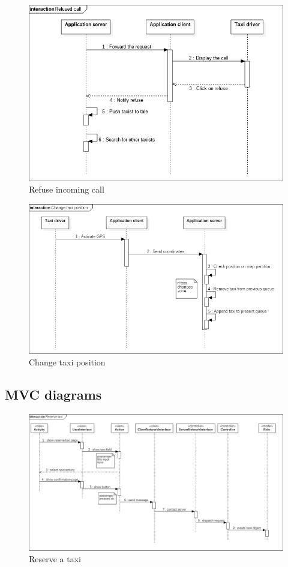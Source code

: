 \begin{figure} [h]
\centering
\includegraphics[scale=0.5]{Sequence Diagrams/refuse_call.png}
\caption{Refuse incoming call }
\end{figure}

\begin{figure} [h]
\centering
\includegraphics[scale=0.5]{Sequence Diagrams/change_taxi_position.png}
\caption{Change taxi position }
\end{figure}

	\subsection{MVC diagrams}
\begin{figure} [h]
\centering
\includegraphics[scale=0.5]{Sequence Diagrams/MVC_reserve_taxi.png}
\caption{Reserve a taxi }
\end{figure}

